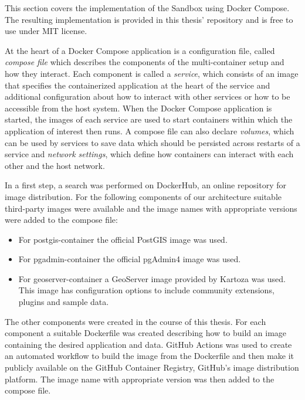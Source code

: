 \documentclass[11pt, a4paper, oneside, parskip=full-]{scrartcl}
\begin{document}
This section covers the implementation of the Sandbox using Docker Compose. The
resulting implementation is provided in this thesis'
repository\cite{osgeostacksandbox} and is free to use under MIT license.

At the heart of a Docker Compose application is a configuration file, called
\emph{compose file} which describes the components of the multi-container setup
and how they interact. Each component is called a \emph{service}, which consists
of an image that specifies the containerized application at the heart of the
service and additional configuration about how to interact with other services
or how to be accessible from the host system. When the Docker Compose
application is started, the images of each service are used to start containers
within which the application of interest then runs. A compose file can also
declare \emph{volumes}, which can be used by services to save data which should
be persisted across restarts of a service and \emph{network settings}, which
define how containers can interact with each other and the host network.

In a first step, a search was performed on DockerHub\cite{dockerhub}, an online
repository for image distribution. For the following components of our
architecture suitable third-party images were available and the image names with
appropriate versions were added to the compose file:

\begin{itemize}
  \item For postgis-container the official PostGIS image was
  used\cite{postgis-container}.
  \item For pgadmin-container the official pgAdmin4 image was
  used\cite{pgadmin-container}.
  \item For geoserver-container a GeoServer image provided by Kartoza was
  used\cite{geoserver-container}. This image has configuration options to
  include community extensions, plugins and sample data.
\end{itemize}

The other components were created in the course of this thesis. For each
component a suitable Dockerfile was created describing how to build an image
containing the desired application and data. GitHub Actions\cite{githubactions}
was used to create an automated workflow to build the image from the Dockerfile
and then make it publicly available on the GitHub Container Registry\cite{gcr},
GitHub's image distribution platform. The image name with appropriate version
was then added to the compose file.
\end{document}

